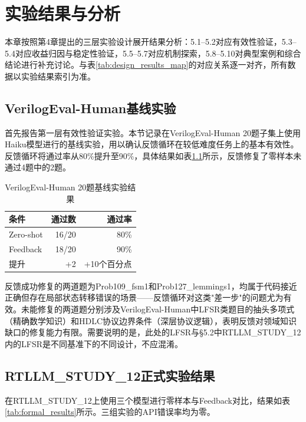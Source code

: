 \chapter{实验结果与分析}

本章按照第4章提出的三层实验设计展开结果分析：5.1--5.2对应有效性验证，5.3--5.4对应收益归因与稳定性验证，5.5--5.7对应机制探索，5.8--5.10对典型案例和综合结论进行补充讨论。与表\ref{tab:design_results_map}的对应关系逐一对齐，所有数据以实验结果索引为准。

\section{VerilogEval-Human基线实验}

首先报告第一层有效性验证实验。本节记录在VerilogEval-Human 20题子集上使用Haiku模型进行的基线实验，用以确认反馈循环在较低难度任务上的基本有效性。反馈循环将通过率从80\%提升至90\%，具体结果如表\ref{tab:verilogeval_baseline}所示，反馈修复了零样本未通过4题中的2题。

\begin{table}[htbp]
\centering
\caption{VerilogEval-Human 20题基线实验结果}
\label{tab:verilogeval_baseline}
\begin{tabular}{lrr}
\toprule
条件 & 通过数 & 通过率 \\
\midrule
Zero-shot & 16/20 & 80\% \\
Feedback & 18/20 & 90\% \\
提升 & +2 & +10个百分点 \\
\bottomrule
\end{tabular}
\end{table}




反馈成功修复的两道题为Prob109\_fsm1和Prob127\_lemmings1，均属于代码接近正确但存在局部状态转移错误的场景——反馈循环对这类"差一步"的问题尤为有效。未能修复的两道题分别涉及VerilogEval-Human中LFSR类题目的抽头多项式（精确数学知识）和HDLC协议边界条件（深层协议逻辑），表明反馈对领域知识缺口的修复能力有限。需要说明的是，此处的LFSR与§5.2中RTLLM\_STUDY\_12内的LFSR是不同基准下的不同设计，不应混淆。

\section{RTLLM\_STUDY\_12正式实验结果}

在RTLLM\_STUDY\_12上使用三个模型进行零样本与Feedback对比，结果如表\ref{tab:formal_results}所示。三组实验的API错误率均为零。

